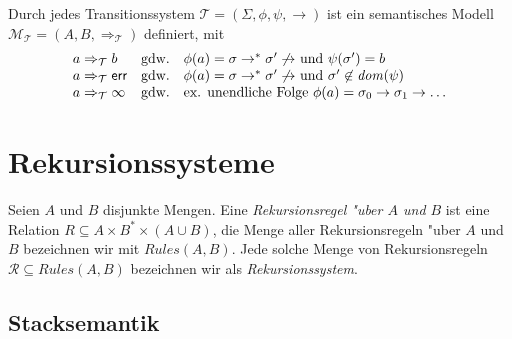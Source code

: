 \documentclass[12pt,a4paper,final]{article}
\begin{document}
\begin{definition}
  Durch jedes Transitionssystem \mbox{$\mathcal{T} = (\Sigma,\phi,\psi,\rightarrow)$} ist ein
  semantisches Modell \mbox{$\mathcal{M}_{\mathcal{T}} = (A,B,\Rightarrow_{\mathcal{T}})$} definiert,
  mit
  \[\begin{array}{lcl}
    a \Rightarrow_{\mathcal{T}} b
    & \text{gdw.} &
    \text{$\phi(a) = \sigma \rightarrow^* \sigma' \not\rightarrow$ und $\psi(\sigma') = b$} \\
    a \Rightarrow_{\mathcal{T}} \textsf{err}
    & \text{gdw.} &
    \text{$\phi(a) = \sigma \rightarrow^* \sigma' \not\rightarrow$ und $\sigma' \not\in \operatorname{\mathit{dom}}(\psi)$} \\
    a \Rightarrow_{\mathcal{T}} \infty
    & \text{gdw.} &
    \text{ex. unendliche Folge $\phi(a) = \sigma_0 \rightarrow \sigma_1 \rightarrow \ldots$}
  \end{array}\]
\end{definition}



\section{Rekursionssysteme}
\label{sec:Rekursionssysteme}

\begin{definition}
  Seien $A$ und $B$ disjunkte Mengen.
  Eine \emph{Rekursionsregel "uber $A$ und $B$} ist eine Relation
  \mbox{$R \subseteq A \times B^* \times (A \cup B)$}, die Menge aller Rekursionsregeln
  "uber $A$ und $B$ bezeichnen wir mit \mbox{$\mathit{Rules}(A,B)$}.
  Jede solche Menge von Rekursionsregeln \mbox{$\mathcal{R} \subseteq \mathit{Rules}(A,B)$}
  bezeichnen wir als \emph{Rekursionssystem}.
\end{definition}



\subsection{Stacksemantik}
\label{sec:Stacksemantik}
\end{document}

